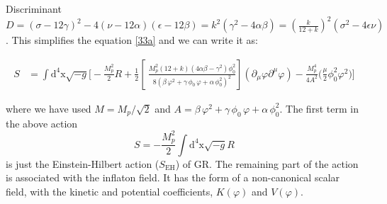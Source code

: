 \documentclass[aps,prd,reprint,preprintnumbers,showpacs,floatfix,nofootinbib,superscript address]{revtex4-2}
\begin{document}

Discriminant $D = (\sigma -12 \gamma )^2-4 (\nu -12 \alpha ) (\epsilon -12 \beta ) = k^2 (\gamma^2 - 4\alpha \beta) = (\frac{k}{12+k})^2 (\sigma^2 -4 \epsilon \nu)$. This simplifies the equation \ref{33a} and we can write it as:
\begin{widetext}
    \begin{equation} 
    \begin{aligned}
        S &= \int \text{d}^4\text{x} \sqrt{-g} \Bigg[- \frac{M_p^2}{2}R + \frac{1}{2} \left[\ \frac{M_p^2(12+k)(4\alpha\beta-\gamma^2) \phi_0^2}{8(\beta\,\varphi^2 + \gamma\,\phi_0\,\varphi + \alpha\,\phi_0^2)^2} \right] (\partial_\mu \varphi \partial^\mu \varphi) -  \frac{M_p^4}{4A^2} \bigg( \frac{\mu}{2} \phi^2_0 \varphi^2 \bigg) \Bigg] 
    \end{aligned}
    \end{equation}
\end{widetext}
where we have used $M=M_p/\sqrt{2} $ and $A =\beta\,\varphi^2 + \gamma\,\phi_0\,\varphi + \alpha\,\phi_0^2$. The first term in the above action \[S = - \frac{M_p^2}{2}\int \text{d}^4\text{x} \sqrt{-g} R\] is just the Einstein-Hilbert action ($S_\text{EH}$) of GR. The remaining part of the action is associated with the inflaton field. It has the form of a non-canonical scalar field, with the kinetic and potential coefficients, $K(\varphi)$ and $V(\varphi)$.
\end{document}
